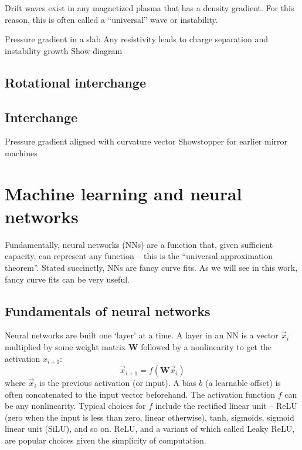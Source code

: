 Drift waves exist in any magnetized plasma that has a density gradient. For this reason, this is often called a ``universal'' wave or instability. 

Pressure gradient in a slab
Any resistivity leads to charge separation and instability growth
Show diagram 

\subsection{Rotational interchange}



\subsection{Interchange}

Pressure gradient aligned with curvature vector
Showstopper for earlier mirror machines

\section{Machine learning and neural networks}

Fundamentally, neural networks (NNs) are a function that, given sufficient capacity, can represent any function -- this is the ``universal approximation theorem''. Stated succinctly, NNs are fancy curve fits. As we will see in this work, fancy curve fits can be very useful.

\subsection{Fundamentals of neural networks}

Neural networks are built one `layer' at a time. A layer in an NN is a vector $\vec x_i$ multiplied by some weight matrix $\mathbf{W}$ followed by a nonlinearity to get the activation $x_{i+1}$:
\begin{equation}
	\vec x_{i+1} = f( \mathbf{W} \vec x_i)
\end{equation}
where $\vec x_i$ is the previous activation (or input). A bias $b$ (a learnable offset) is often concatenated to the input vector beforehand. The activation function $f$ can be any nonlinearity. Typical choices for $f$ include the rectified  linear unit -- ReLU (zero when the input is less than zero, linear otherwise), tanh, sigmoids, sigmoid linear unit (SiLU), and so on. ReLU, and a variant of which called Leaky ReLU, are popular choices given the simplicity of computation.

